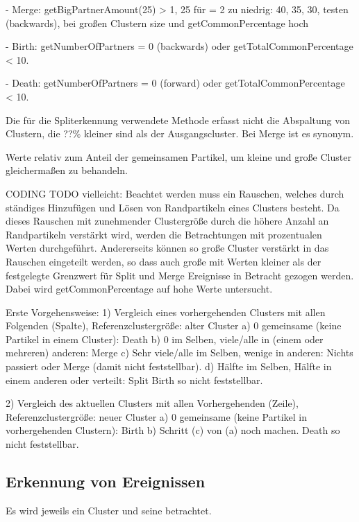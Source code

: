 - Merge: getBigPartnerAmount(25) > 1, 25 für = 2 zu niedrig: 40, 35, 30, testen (backwards), bei großen Clustern size und getCommonPercentage hoch

- Birth: getNumberOfPartners = 0 (backwards) oder getTotalCommonPercentage < 10.

- Death: getNumberOfPartners = 0 (forward) oder getTotalCommonPercentage < 10.

Die für die Spliterkennung verwendete Methode erfasst nicht die Abspaltung von Clustern, die ??\% kleiner sind als der Ausgangscluster. Bei Merge ist es synonym.

Werte relativ zum Anteil der gemeinsamen Partikel, um kleine und große Cluster gleichermaßen zu behandeln.

CODING TODO vielleicht:
Beachtet werden muss ein Rauschen, welches durch ständiges Hinzufügen und Lösen von Randpartikeln eines Clusters besteht. Da dieses Rauschen mit zunehmender Clustergröße durch die höhere Anzahl an Randpartikeln verstärkt wird, werden die Betrachtungen mit prozentualen Werten durchgeführt. Andererseits können so große Cluster verstärkt in das Rauschen eingeteilt werden, so dass auch große  mit Werten kleiner als der festgelegte Grenzwert für Split und Merge Ereignisse in Betracht gezogen werden. Dabei wird getCommonPercentage auf hohe Werte untersucht.



Erste Vorgehensweise:
1) Vergleich eines vorhergehenden Clusters mit allen Folgenden (Spalte), Referenzclustergröße: alter Cluster
a) 0 gemeinsame (keine Partikel in einem Cluster): Death
b) 0 im Selben, viele/alle in (einem oder mehreren) anderen: Merge
c) Sehr viele/alle im Selben, wenige in anderen: Nichts passiert oder Merge (damit nicht feststellbar).
d) Hälfte im Selben, Hälfte in einem anderen oder verteilt: Split
Birth so nicht feststellbar.

2) Vergleich des aktuellen Clusters mit allen Vorhergehenden (Zeile), Referenzclustergröße: neuer Cluster
a) 0 gemeinsame (keine Partikel in vorhergehenden Clustern): Birth
b) Schritt (c) von (a) noch machen.
Death so nicht feststellbar.

\subsection{Erkennung von Ereignissen}\label{sec:ereigniserkennung}

Es wird jeweils ein Cluster und seine  betrachtet.

